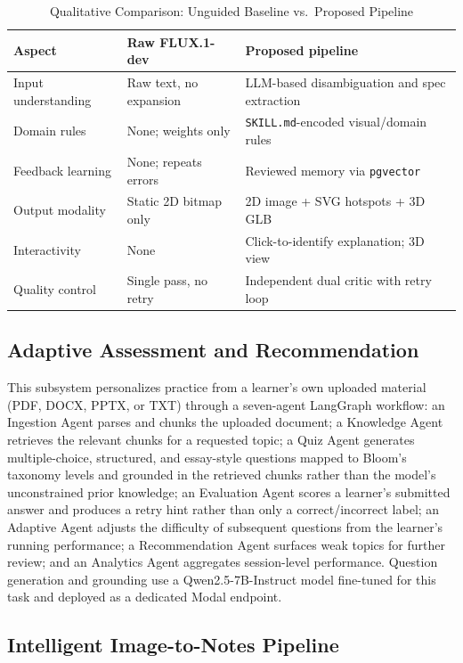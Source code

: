 \documentclass[conference]{IEEEtran}
\begin{document}
\begin{table}[t]
\caption{Qualitative Comparison: Unguided Baseline vs.\ Proposed Pipeline}
\label{tab:baseline-compare}
\centering
\begin{tabular}{p{1.8cm} p{2.6cm} p{2.9cm}}
\toprule
\textbf{Aspect} & \textbf{Raw FLUX.1-dev} & \textbf{Proposed pipeline} \\
\midrule
Input understanding & Raw text, no expansion & LLM-based disambiguation and spec extraction \\
Domain rules & None; weights only & \texttt{SKILL.md}-encoded visual/domain rules \\
Feedback learning & None; repeats errors & Reviewed memory via \texttt{pgvector} \\
Output modality & Static 2D bitmap only & 2D image + SVG hotspots + 3D GLB \\
Interactivity & None & Click-to-identify explanation; 3D view \\
Quality control & Single pass, no retry & Independent dual critic with retry loop \\
\bottomrule
\end{tabular}
\end{table}

\subsection{Adaptive Assessment and Recommendation}
\label{sec:quiz}

This subsystem personalizes practice from a learner's own uploaded material (PDF, DOCX, PPTX, or TXT) through a seven-agent LangGraph workflow: an Ingestion Agent parses and chunks the uploaded document; a Knowledge Agent retrieves the relevant chunks for a requested topic; a Quiz Agent generates multiple-choice, structured, and essay-style questions mapped to Bloom's taxonomy levels and grounded in the retrieved chunks rather than the model's unconstrained prior knowledge; an Evaluation Agent scores a learner's submitted answer and produces a retry hint rather than only a correct/incorrect label; an Adaptive Agent adjusts the difficulty of subsequent questions from the learner's running performance; a Recommendation Agent surfaces weak topics for further review; and an Analytics Agent aggregates session-level performance. Question generation and grounding use a Qwen2.5-7B-Instruct model fine-tuned for this task and deployed as a dedicated Modal endpoint.

\subsection{Intelligent Image-to-Notes Pipeline}
\label{sec:ocr}
\end{document}
